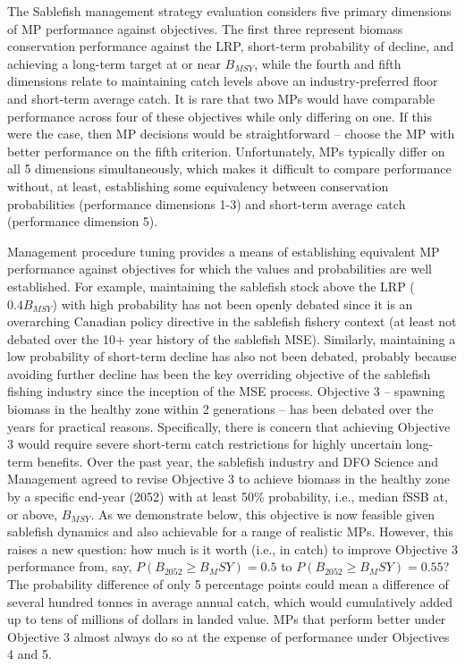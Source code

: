 \documentclass[11pt]{book}
\begin{document}
The Sablefish management strategy evaluation considers five primary dimensions of MP performance against objectives. The first three represent biomass conservation performance against the LRP, short-term probability of decline, and achieving a long-term target at or near \(B_{MSY}\), while the fourth and fifth dimensions relate to maintaining catch levels above an industry-preferred floor and short-term average catch. It is rare that two MPs would have comparable performance across four of these objectives while only differing on one. If this were the case, then MP decisions would be straightforward -- choose the MP with better performance on the fifth criterion. Unfortunately, MPs typically differ on all 5 dimensions simultaneously, which makes it difficult to compare performance without, at least, establishing some equivalency between conservation probabilities (performance dimensions 1-3) and short-term average catch (performance dimension 5).

Management procedure tuning provides a means of establishing equivalent MP performance against objectives for which the values and probabilities are well established. For example, maintaining the sablefish stock above the LRP (\(0.4B_{MSY}\)) with high probability has not been openly debated since it is an overarching Canadian policy directive in the sablefish fishery context (at least not debated over the 10+ year history of the sablefish MSE). Similarly, maintaining a low probability of short-term decline has also not been debated, probably because avoiding further decline has been the key overriding objective of the sablefish fishing industry since the inception of the MSE process. Objective 3 -- spawning biomass in the healthy zone within 2 generations -- has been debated over the years for practical reasons. Specifically, there is concern that achieving Objective 3 would require severe short-term catch restrictions for highly uncertain long-term benefits. Over the past year, the sablefish industry and DFO Science and Management agreed to revise Objective 3 to achieve biomass in the healthy zone by a specific end-year (2052) with at least 50\% probability, i.e., median fSSB at, or above, \(B_{MSY}\). As we demonstrate below, this objective is now feasible given sablefish dynamics and also achievable for a range of realistic MPs. However, this raises a new question: how much is it worth (i.e., in catch) to improve Objective 3 performance from, say, \(P(B_{2052} \geq B_MSY) = 0.5\) to \(P(B_{2052} \geq B_MSY) = 0.55\)? The probability difference of only 5 percentage points could mean a difference of several hundred tonnes in average annual catch, which would cumulatively added up to tens of millions of dollars in landed value. MPs that perform better under Objective 3 almost always do so at the expense of performance under Objectives 4 and 5.
\end{document}
